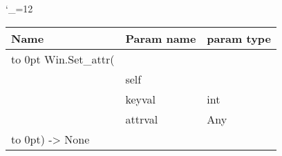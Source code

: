 \begingroup \catcode`\_=12 \tt
\begin{tabular}{lll}
\toprule
\textrm{Name}&\textrm{Param name}&\textrm{param type}\\
\midrule
\hbox to 0pt {Win.Set_attr(\hss}\\
& self\\
& keyval & int\\
& attrval & Any\\
\hbox to 0pt{) -> None\hss}\\
\bottomrule
\end{tabular}
\endgroup
